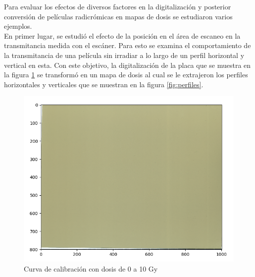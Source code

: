Para evaluar los efectos de diversos factores en la digitalización y posterior conversión de películas radicrómicas en mapas de dosis se estudiaron varios ejemplos. \\

En primer lugar, se estudió el efecto de la posición en el área de escaneo en la transmitancia medida con el escáner. Para esto se examina el comportamiento de la transmitancia de una película sin irradiar a lo largo de un perfil horizontal y vertical en esta. Con este objetivo, la digitalización de la placa que se muestra en la figura \ref{fig:fondoCero} se transformó en un mapa de dosis al cual se le extrajeron los perfiles horizontales y verticales que se muestran en la figura \ref{fig:perfiles}.\\

\begin{figure}[H]
	\centering
	\includegraphics[width=0.7\linewidth]{images/imagenFondoCero.png}
	\caption{Curva de calibración con dosis de 0 a 10 Gy }
	\label{fig:fondoCero}
\end{figure}

